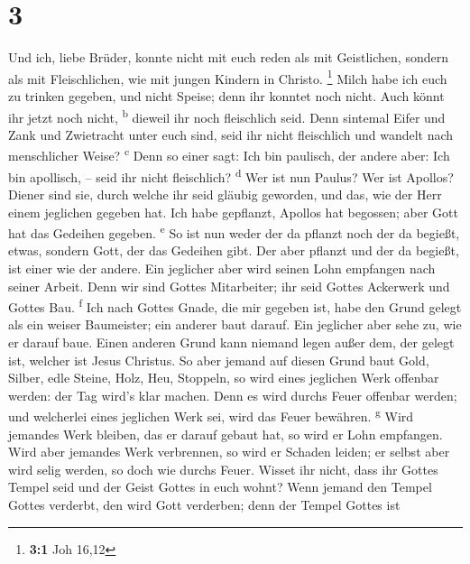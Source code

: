 \hypertarget{section-2}{%
\section{3}\label{section-2}}

 Und ich, liebe Brüder, konnte nicht mit euch reden als
mit Geistlichen, sondern als mit Fleischlichen, wie mit jungen Kindern
in Christo. \footnote{\textbf{3:1} Joh 16,12}  Milch habe
ich euch zu trinken gegeben, und nicht Speise; denn ihr konntet noch
nicht. Auch könnt ihr jetzt noch nicht, \textsuperscript{b}
 dieweil ihr noch fleischlich seid. Denn sintemal Eifer
und Zank und Zwietracht unter euch sind, seid ihr nicht fleischlich und
wandelt nach menschlicher Weise? \textsuperscript{c}  Denn
so einer sagt: Ich bin paulisch, der andere aber: Ich bin apollisch, --
seid ihr nicht fleischlich? \textsuperscript{d}  Wer ist
nun Paulus? Wer ist Apollos? Diener sind sie, durch welche ihr seid
gläubig geworden, und das, wie der Herr einem jeglichen gegeben hat.
 Ich habe gepflanzt, Apollos hat begossen; aber Gott hat
das Gedeihen gegeben. \textsuperscript{e}  So ist nun
weder der da pflanzt noch der da begießt, etwas, sondern Gott, der das
Gedeihen gibt.  Der aber pflanzt und der da begießt, ist
einer wie der andere. Ein jeglicher aber wird seinen Lohn empfangen nach
seiner Arbeit.  Denn wir sind Gottes Mitarbeiter; ihr seid
Gottes Ackerwerk und Gottes Bau. \textsuperscript{f}  Ich
nach Gottes Gnade, die mir gegeben ist, habe den Grund gelegt als ein
weiser Baumeister; ein anderer baut darauf. Ein jeglicher aber sehe zu,
wie er darauf baue.  Einen anderen Grund kann niemand
legen außer dem, der gelegt ist, welcher ist Jesus Christus.
 So aber jemand auf diesen Grund baut Gold, Silber, edle
Steine, Holz, Heu, Stoppeln,  so wird eines jeglichen
Werk offenbar werden: der Tag wird's klar machen. Denn es wird durchs
Feuer offenbar werden; und welcherlei eines jeglichen Werk sei, wird das
Feuer bewähren. \textsuperscript{g}  Wird jemandes Werk
bleiben, das er darauf gebaut hat, so wird er Lohn empfangen.
 Wird aber jemandes Werk verbrennen, so wird er Schaden
leiden; er selbst aber wird selig werden, so doch wie durchs Feuer.
 Wisset ihr nicht, dass ihr Gottes Tempel seid und der
Geist Gottes in euch wohnt?  Wenn jemand den Tempel
Gottes verderbt, den wird Gott verderben; denn der Tempel Gottes ist
